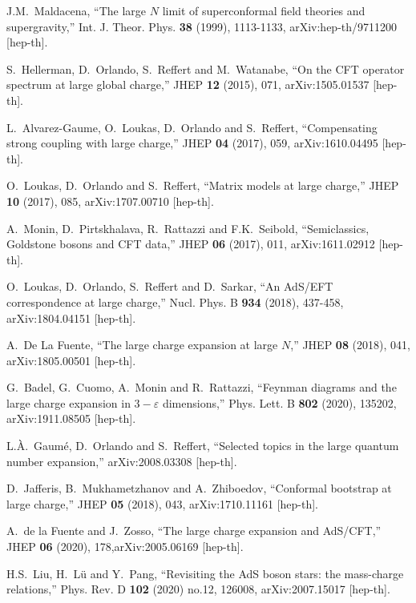 \documentclass[11pt]{article}
\begin{document}
\begin{thebibliography}{99}

J.M.~Maldacena,
``The large $N$ limit of superconformal field theories and supergravity,''
Int. J. Theor. Phys. \textbf{38} (1999), 1113-1133, arXiv:hep-th/9711200 [hep-th].

S.~Hellerman, D.~Orlando, S.~Reffert and M.~Watanabe, ``On the CFT operator spectrum at large global charge,''
JHEP \textbf{12} (2015), 071, arXiv:1505.01537 [hep-th].

 L.~Alvarez-Gaume, O.~Loukas, D.~Orlando and S.~Reffert, ``Compensating strong coupling with large charge,'' JHEP \textbf{04} (2017), 059, arXiv:1610.04495 [hep-th].

O.~Loukas, D.~Orlando and S.~Reffert, ``Matrix models at large charge,'' JHEP \textbf{10} (2017), 085, arXiv:1707.00710 [hep-th].

 A.~Monin, D.~Pirtskhalava, R.~Rattazzi and F.K.~Seibold, ``Semiclassics, Goldstone bosons and
CFT data,'' JHEP \textbf{06} (2017), 011, arXiv:1611.02912 [hep-th].

O.~Loukas, D.~Orlando, S.~Reffert and D.~Sarkar,
``An AdS/EFT correspondence at large charge,''
Nucl. Phys. B \textbf{934} (2018), 437-458, arXiv:1804.04151 [hep-th].

 A.~De La Fuente, ``The large charge expansion at large $N$,'' JHEP \textbf{08} (2018),
041, arXiv:1805.00501 [hep-th].

 G.~Badel, G.~Cuomo, A.~Monin and R.~Rattazzi, ``Feynman diagrams and the large charge expansion in $3-\varepsilon$ dimensions,'' Phys. Lett. B \textbf{802} (2020), 135202, arXiv:1911.08505 [hep-th].



 L.\`A.~Gaum\'e, D.~Orlando and S.~Reffert, ``Selected topics in the large quantum number
expansion,'' arXiv:2008.03308 [hep-th].

 D.~Jafferis, B.~Mukhametzhanov and A.~Zhiboedov, ``Conformal bootstrap at large charge,''
JHEP \textbf{05} (2018), 043, arXiv:1710.11161 [hep-th].

 A.~de la Fuente and J.~Zosso, ``The large charge expansion and AdS/CFT,''
JHEP \textbf{06} (2020), 178,arXiv:2005.06169 [hep-th].

H.S.~Liu, H.~L\"u and Y.~Pang,
``Revisiting the AdS boson stars: the mass-charge relations,''
Phys. Rev. D \textbf{102} (2020) no.12, 126008, arXiv:2007.15017 [hep-th].


\end{thebibliography}
\end{document}
